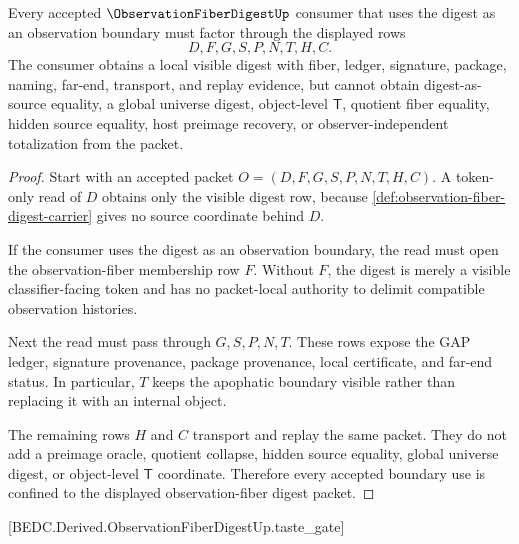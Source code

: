 \begin{theorem}
\label{thm:observation-fiber-digest-nonescape}
Every accepted $\ObservationFiberDigestUp$ consumer that uses the digest as an observation boundary must factor through the displayed rows
$$
D,F,G,S,P,N,T,H,C.
$$
The consumer obtains a local visible digest with fiber, ledger, signature, package, naming, far-end, transport, and replay evidence, but cannot obtain digest-as-source equality, a global universe digest, object-level $\mathsf{T}$, quotient fiber equality, hidden source equality, host preimage recovery, or observer-independent totalization from the packet.
\end{theorem}
\begin{proof}
Start with an accepted packet $O=(D,F,G,S,P,N,T,H,C)$. A token-only read of $D$ obtains only the visible digest row, because \autoref{def:observation-fiber-digest-carrier} gives no source coordinate behind $D$.

If the consumer uses the digest as an observation boundary, the read must open the observation-fiber membership row $F$. Without $F$, the digest is merely a visible classifier-facing token and has no packet-local authority to delimit compatible observation histories.

Next the read must pass through $G,S,P,N,T$. These rows expose the GAP ledger, signature provenance, package provenance, local certificate, and far-end status. In particular, $T$ keeps the apophatic boundary visible rather than replacing it with an internal object.

The remaining rows $H$ and $C$ transport and replay the same packet. They do not add a preimage oracle, quotient collapse, hidden source equality, global universe digest, or object-level $\mathsf{T}$ coordinate. Therefore every accepted boundary use is confined to the displayed observation-fiber digest packet.
\end{proof}

[BEDC.Derived.ObservationFiberDigestUp.taste\_gate]

